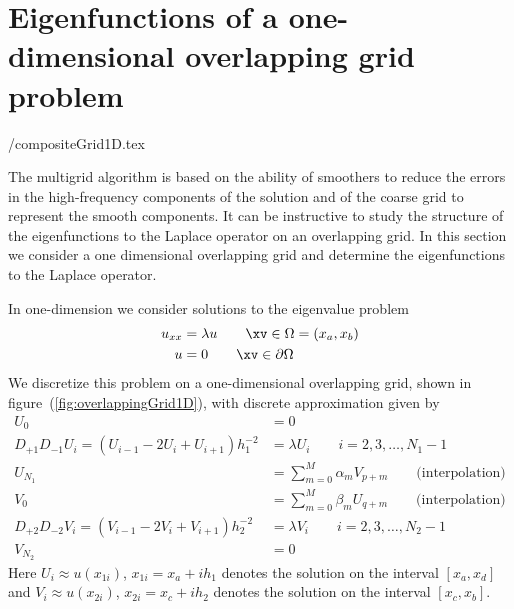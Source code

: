 
\clearpage
\section{Eigenfunctions of a one-dimensional overlapping grid problem}\label{sec:eigenfunctions}

 \ogmgDocDir/compositeGrid1D.tex

  The multigrid algorithm is based on the ability of smoothers to reduce the errors in the
high-frequency components of the solution and of the coarse grid to represent the smooth components.
It can be instructive to study the structure of the eigenfunctions to the Laplace operator
on an overlapping grid. In this section we consider a one dimensional overlapping grid and determine the
eigenfunctions to the Laplace operator.






In one-dimension we consider solutions to the eigenvalue problem
\begin{align*}
    u_{xx} &= \lambda u  \qquad \xv\in\Omega=(x_a,x_b) \\
    u &= 0  \qquad \xv\in\partial\Omega
\end{align*}
We discretize this problem on a one-dimensional overlapping grid, shown in figure~(\ref{fig:overlappingGrid1D}),
with discrete approximation given by
\begin{align*}
   U_0 &= 0 \\
   D_{+1}D_{-1} U_i = (U_{i-1}-2U_i + U_{i+1}) h_1^{-2} & = \lambda U_i \qquad i=2,3,\ldots,N_1-1 \\
   U_{N_1} &= \sum_{m=0}^M \alpha_m V_{p+m} \qquad \mbox{(interpolation)}\\
   V_0 &= \sum_{m=0}^M \beta_m U_{q+m} \qquad \mbox{(interpolation)}\\
   D_{+2}D_{-2} V_i = (V_{i-1}-2V_i + V_{i+1}) h_2^{-2}  & = \lambda V_i \qquad i=2,3,\ldots,N_2-1 \\
   V_{N_2} &=0 
\end{align*}
Here $U_i\approx u(x_{1i})$, $x_{1i}=x_a+i h_1$ denotes the solution on the interval $[x_a,x_d]$
and $V_i\approx u(x_{2i})$, $x_{2i}=x_c+i h_2$ denotes the solution on the interval $[x_c,x_b]$.

